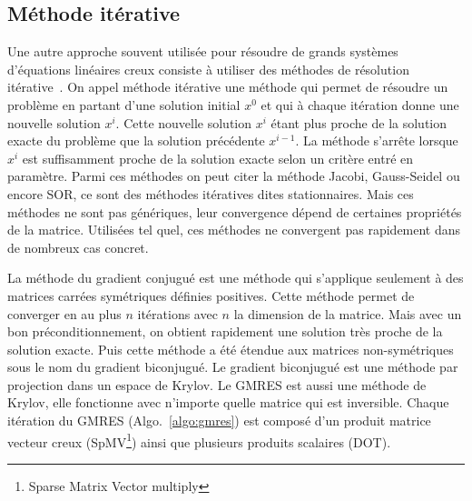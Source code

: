 \subsection{Méthode itérative}
Une autre approche souvent utilisée pour résoudre de grands systèmes d'équations linéaires creux consiste à utiliser des méthodes de résolution itérative~\cite{Saad96IMSLS}.
%
On appel méthode itérative une méthode qui permet de résoudre un problème en partant d'une solution initial $x^0$ et qui à chaque itération donne une nouvelle solution $x^i$.
%
Cette nouvelle solution $x^i$ étant plus proche de la solution exacte du problème que la solution précédente $x^{i-1}$.
%
La méthode s'arrête lorsque $x^i$ est suffisamment proche de la solution exacte selon un critère entré en paramètre.
%
Parmi ces méthodes on peut citer la méthode Jacobi, Gauss-Seidel ou encore SOR, ce sont des méthodes itératives dites stationnaires.
%
Mais ces méthodes ne sont pas génériques, leur convergence dépend de certaines propriétés de la matrice.
%
Utilisées tel quel, ces méthodes ne convergent pas rapidement dans de nombreux cas concret.




La méthode du gradient conjugué est une méthode qui s'applique seulement à des matrices carrées symétriques définies positives.
%
Cette méthode permet de converger en au plus $n$ itérations avec $n$ la dimension de la matrice.
%
Mais avec un bon préconditionnement, on obtient rapidement une solution très proche de la solution exacte.
%
Puis cette méthode a été étendue aux matrices non-symétriques sous le nom du gradient biconjugué.
%
Le gradient biconjugué est une méthode par projection dans un espace de Krylov.
%
Le GMRES est aussi une méthode de Krylov, elle fonctionne avec n'importe quelle matrice qui est inversible.
%
Chaque itération du GMRES (Algo.~\ref{algo:gmres}) est composé d'un produit matrice vecteur creux (SpMV\footnote{Sparse Matrix Vector multiply}) ainsi que plusieurs produits scalaires (DOT).


